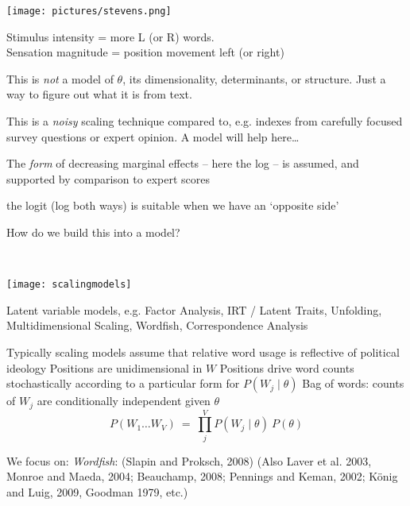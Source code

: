 \documentclass[kp]{foilpack}
\begin{document}

\centerline{\texttt{[image: pictures/stevens.png]}}

Stimulus intensity = more L (or R) words.\\
Sensation magnitude = position movement left (or right)


This is \textit{not} a  {model} of $\theta$, its dimensionality, determinants, or structure.  Just a way to figure out what it is from text.

This is a \textsl{noisy} scaling technique compared to, e.g. indexes from carefully focused survey questions or expert opinion.  A model will help here\ldots

The \textsl{form} of decreasing marginal effects -- here the log -- is assumed, and supported by comparison to expert scores

the logit (log both ways) is suitable when we have an `opposite side'


How do we build this into a model?

~\\
\centerline{\texttt{[image: scalingmodels]}}

Latent variable models, e.g.
\ita
\itm Factor Analysis, IRT / Latent Traits, Unfolding, Multidimensional Scaling, Wordfish,
Correspondence Analysis 
\itz







Typically scaling models assume that
\ita
\itm relative word usage is reflective of political ideology
\itm Positions are unidimensional in $W$ 
\itm Positions drive word counts stochastically according to a particular form for $P(W_{j} \mid \theta)$
\itm Bag of words: counts of $W_{j}$ are conditionally independent given $\theta$
\[
P(W_{1}\ldots W_{V}) ~=~ \prod^{V}_{j} P(W_{j} \mid \theta)~ P(\theta)
\] 
\itz 


We focus on:
\ita
\itm \textit{Wordfish}: (Slapin and Proksch, 2008)
\itm (Also Laver et al. 2003, Monroe and Maeda, 2004; Beauchamp, 2008; Pennings and Keman, 2002; K\"{o}nig and Luig, 2009, Goodman 1979, etc.)
\itz
\end{document}

